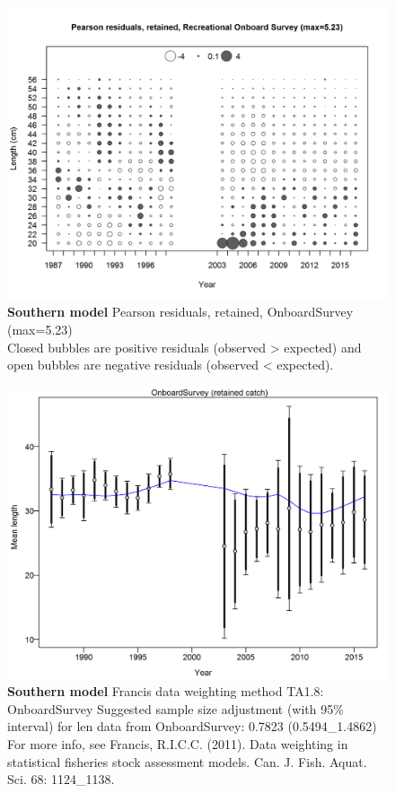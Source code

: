 \documentclass[12pt,]{article}
\begin{document}
\begin{figure}[htbp]
\centering
\includegraphics{./r4ss/plots_mod2/comp_lenfit_residsflt3mkt2.png}
\caption{\textbf{Southern model} Pearson residuals, retained,
OnboardSurvey (max=5.23)\\
Closed bubbles are positive residuals (observed \textgreater{} expected)
and open bubbles are negative residuals (observed \textless{} expected).
\label{fig:mod2_10_comp_lenfit_residsflt3mkt2}}
\end{figure}

\begin{figure}[htbp]
\centering
\includegraphics{./r4ss/plots_mod2/comp_lenfit_data_weighting_TA1.8_OnboardSurvey.png}
\caption{\textbf{Southern model} Francis data weighting method TA1.8:
OnboardSurvey Suggested sample size adjustment (with 95\% interval) for
len data from OnboardSurvey: 0.7823 (0.5494\_1.4862) For more info, see
Francis, R.I.C.C. (2011). Data weighting in statistical fisheries stock
assessment models. Can. J. Fish. Aquat. Sci. 68: 1124\_1138.
\label{fig:mod2_12_comp_lenfit_data_weighting_TA1.8_OnboardSurvey}}
\end{figure}
\end{document}
